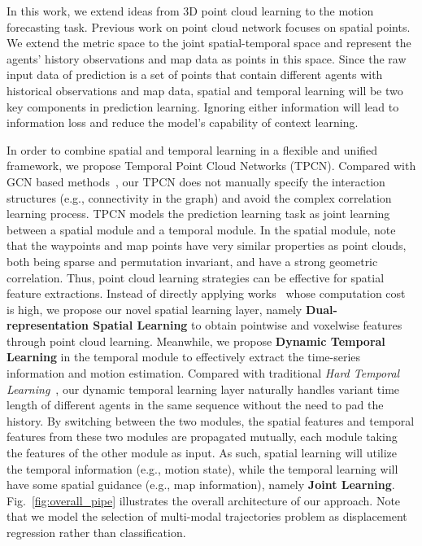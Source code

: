 \documentclass[final]{cvpr}
\begin{document}
In this work, we extend ideas from 3D point cloud learning to the motion forecasting task. Previous work on point cloud network focuses on spatial points. We extend the metric space to the joint spatial-temporal space and represent the agents' history observations and map data as points in this space.
Since the raw input data of prediction is a set of points that contain different agents with historical observations and map data, spatial and temporal learning will be two key components in prediction learning. 
Ignoring either information will lead to information loss and reduce the model's capability of context learning.

In order to combine spatial and temporal learning in a flexible and unified framework, we propose Temporal Point Cloud Networks (TPCN). Compared with GCN based methods~\cite{gao2020vectornet,liang2020learning}, our TPCN does not manually specify the interaction structures (e.g., connectivity in the graph) and avoid the complex correlation learning process.
TPCN models the prediction learning task as joint learning between a spatial module and a temporal module. In the spatial module, note that the waypoints and map points have very similar properties as point clouds, both being sparse and permutation invariant, and have a strong geometric correlation. Thus, point cloud learning strategies can be effective for spatial feature extractions. 
Instead of directly applying works~\cite{qi2017pointnet, qiPointNetDeepHierarchical2017a,thomas2019kpconv, ye2020hvnet} whose computation cost is high, we propose our novel spatial learning layer, namely \textbf{Dual-representation Spatial Learning} to obtain pointwise and voxelwise features through point cloud learning. Meanwhile, we propose \textbf{Dynamic Temporal Learning} in the temporal module to effectively extract the time-series information and motion estimation. Compared with traditional \textit{Hard Temporal Learning}~\cite{bai1803empirical, lea2017temporal,liang2020learning}, 
our dynamic temporal learning layer naturally handles variant time length of different agents in the same sequence without the need to pad the history.
By switching between the two modules, the spatial features and temporal features from these two modules are propagated mutually, each module taking the features of the other module as input. As such, spatial learning will utilize the temporal information (e.g., motion state), while the temporal learning will have some spatial guidance (e.g., map information), namely \textbf{Joint Learning}. Fig.~\ref{fig:overall_pipe} illustrates the overall architecture of our approach. Note that we model the selection of multi-modal trajectories problem as displacement regression rather than classification.  
\end{document}
